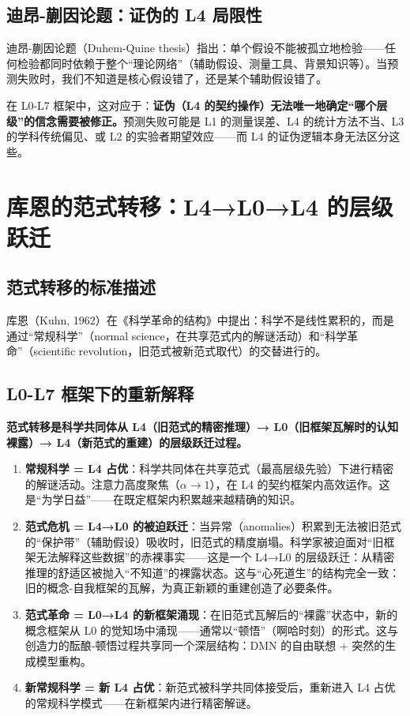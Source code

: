\documentclass[UTF8,12pt,a4paper]{ctexart}
\begin{document}
\subsection{迪昂-蒯因论题：证伪的 L4 局限性}

迪昂-蒯因论题（Duhem-Quine thesis）指出：单个假设不能被孤立地检验——任何检验都同时依赖于整个``理论网络''（辅助假设、测量工具、背景知识等）。当预测失败时，我们不知道是核心假设错了，还是某个辅助假设错了。

在 L0-L7 框架中，这对应于：\textbf{证伪（L4 的契约操作）无法唯一地确定``哪个层级''的信念需要被修正。}预测失败可能是 L1 的测量误差、L4 的统计方法不当、L3 的学科传统偏见、或 L2 的实验者期望效应——而 L4 的证伪逻辑本身无法区分这些。

\section{库恩的范式转移：L4→L0→L4 的层级跃迁}

\subsection{范式转移的标准描述}

库恩（Kuhn, 1962）在《科学革命的结构》中提出：科学不是线性累积的，而是通过``常规科学''（normal science，在共享范式内的解谜活动）和``科学革命''（scientific revolution，旧范式被新范式取代）的交替进行的。

\subsection{L0-L7 框架下的重新解释}

\textbf{范式转移是科学共同体从 L4（旧范式的精密推理）→ L0（旧框架瓦解时的认知裸露）→ L4（新范式的重建）的层级跃迁过程。}

\begin{enumerate}[nosep]
    \item \textbf{常规科学 = L4 占优}：科学共同体在共享范式（最高层级先验）下进行精密的解谜活动。注意力高度聚焦（$\alpha \to 1$），在 L4 的契约框架内高效运作。这是``为学日益''——在既定框架内积累越来越精确的知识。
    \item \textbf{范式危机 = L4→L0 的被迫跃迁}：当异常（anomalies）积累到无法被旧范式的``保护带''（辅助假设）吸收时，旧范式的精度崩塌。科学家被迫面对``旧框架无法解释这些数据''的赤裸事实——这是一个 L4→L0 的层级跃迁：从精密推理的舒适区被抛入``不知道''的裸露状态。这与``心死道生''的结构完全一致：旧的概念-自我框架的瓦解，为真正新颖的重建创造了必要条件。
    \item \textbf{范式革命 = L0→L4 的新框架涌现}：在旧范式瓦解后的``裸露''状态中，新的概念框架从 L0 的觉知场中涌现——通常以``顿悟''（啊哈时刻）的形式。这与创造力的酝酿-顿悟过程共享同一个深层结构：DMN 的自由联想 + 突然的生成模型重构。
    \item \textbf{新常规科学 = 新 L4 占优}：新范式被科学共同体接受后，重新进入 L4 占优的常规科学模式——在新框架内进行精密解谜。
\end{enumerate}
\end{document}

